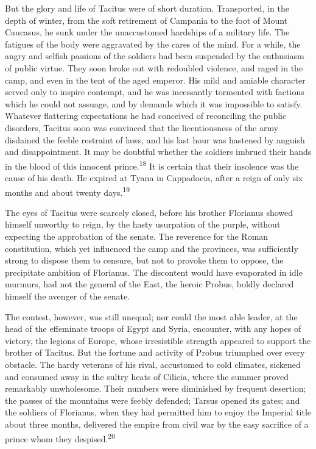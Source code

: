 But the glory and life of Tacitus were of short duration.
Transported, in the depth of winter, from the soft retirement of
Campania to the foot of Mount Caucasus, he sunk under the
unaccustomed hardships of a military life. The fatigues of the
body were aggravated by the cares of the mind. For a while, the
angry and selfish passions of the soldiers had been suspended by
the enthusiasm of public virtue. They soon broke out with
redoubled violence, and raged in the camp, and even in the tent
of the aged emperor. His mild and amiable character served only
to inspire contempt, and he was incessantly tormented with
factions which he could not assuage, and by demands which it was
impossible to satisfy. Whatever flattering expectations he had
conceived of reconciling the public disorders, Tacitus soon was
convinced that the licentiousness of the army disdained the
feeble restraint of laws, and his last hour was hastened by
anguish and disappointment. It may be doubtful whether the
soldiers imbrued their hands in the blood of this innocent
prince.\textsuperscript{18} It is certain that their insolence was the cause of
his death. He expired at Tyana in Cappadocia, after a reign of
only six months and about twenty days.\textsuperscript{19}



The eyes of Tacitus were scarcely closed, before his brother
Florianus showed himself unworthy to reign, by the hasty
usurpation of the purple, without expecting the approbation of
the senate. The reverence for the Roman constitution, which yet
influenced the camp and the provinces, was sufficiently strong to
dispose them to censure, but not to provoke them to oppose, the
precipitate ambition of Florianus. The discontent would have
evaporated in idle murmurs, had not the general of the East, the
heroic Probus, boldly declared himself the avenger of the senate.

The contest, however, was still unequal; nor could the most able
leader, at the head of the effeminate troops of Egypt and Syria,
encounter, with any hopes of victory, the legions of Europe,
whose irresistible strength appeared to support the brother of
Tacitus. But the fortune and activity of Probus triumphed over
every obstacle. The hardy veterans of his rival, accustomed to
cold climates, sickened and consumed away in the sultry heats of
Cilicia, where the summer proved remarkably unwholesome. Their
numbers were diminished by frequent desertion; the passes of the
mountains were feebly defended; Tarsus opened its gates; and the
soldiers of Florianus, when they had permitted him to enjoy the
Imperial title about three months, delivered the empire from
civil war by the easy sacrifice of a prince whom they despised.\textsuperscript{20}

